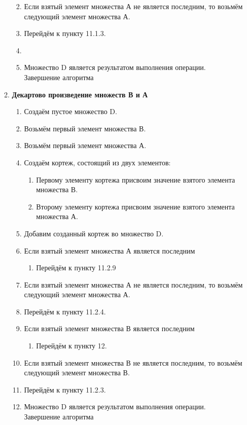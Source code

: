 \documentclass[a4paper,12pt]{extarticle}
\begin{document}
\begin{enumerate}
\begin{enumerate}[label*=\arabic*.]
\begin{enumerate}[label*=\arabic*.]
\begin{enumerate}[label*=\arabic*.]
      \end{enumerate}
      \item Если взятый элемент множества А не является последним, то возьмём следующий элемент множества А.
      \item Перейдём к пункту 11.1.3.
      \item \item Множество D является результатом выполнения операции. Завершение алгоритма
    \end{enumerate}
    \item \textbf{Декартово произведение множеств В и А}
    \begin{enumerate}[label*=\arabic*.]
      \item Создаём пустое множество D.
      \item Возьмём первый элемент множества В.
      \item Возьмём первый элемент множества А.
      \item Создаём кортеж, состоящий из двух элементов:
      \begin{enumerate}[label*=\arabic*.]
        \item Первому элементу кортежа присвоим значение взятого элемента множества В.
        \item Второму элементу кортежа присвоим значение взятого элемента множества А.
      \end{enumerate}
      \item Добавим созданный кортеж во множество D.
      \item Если взятый элемент множества А является последним
      \begin{enumerate}[label*=\arabic*.]
        \item Перейдём к пункту 11.2.9
      \end{enumerate}
      \item Если взятый элемент множества А не является последним, то возьмём следующий элемент множества А.
      \item Перейдём к пункту 11.2.4.
      \item Если взятый элемент множества В является последним
      \begin{enumerate}[label*=\arabic*.]
        \item Перейдём к пункту 12.
      \end{enumerate}
      \item Если взятый элемент множества В не является последним, то возьмём следующий элемент множества В.
      \item Перейдём к пункту 11.2.3.
      \item Множество D является результатом выполнения операции. Завершение алгоритма
    \end{enumerate}
  \end{enumerate}
  \
\end{enumerate}
\end{document}
